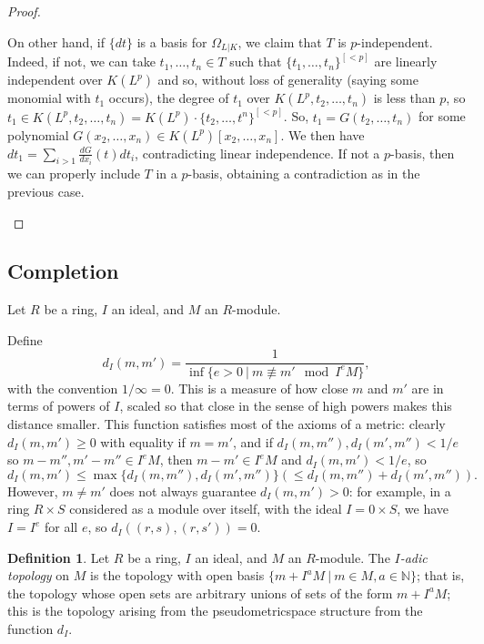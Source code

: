 \documentclass{amsart}[12pt]
\newcommand{\N}{\mathbb{N}}
\numberwithin{equation}{section}
\theoremstyle{plain} %
\theoremstyle{definition}
\newtheorem{defn}[equation]{Definition}
\theoremstyle{remark}
\begin{document}
\begin{proof}
\begin{enumerate}
On other hand, if $\{dt\}$ is a basis for  $\Omega_{L|K}$, we claim that $T$ is $p$-independent. Indeed, if not, we can take $t_1,\dots,t_n \in T$ such that $\{t_1,\dots,t_n\}^{[<p]}$ are linearly independent over $K(L^p)$ and so, without loss of generality (saying some monomial with $t_1$ occurs), the degree of $t_1$ over  $K(L^p,t_2,\dots,t_n)$ is less than $p$, so $t_1\in K(L^p,t_2,\dots,t_n)=K(L^p)\cdot \{t_2,\dots,t^n\}^{[<p]}$. So, $t_1=G(t_2,\dots,t_n)$ for some polynomial $G(x_2,\dots,x_n)\in K(L^p)[x_2,\dots,x_n]$. We then have $dt_1 = \sum_{i>1} \frac{d G}{d x_i}(t) dt_i$, contradicting linear independence. If not a $p$-basis, then we can properly include $T$ in a $p$-basis, obtaining a contradiction as in the previous case.\qedhere
\end{enumerate}
\end{proof}


\subsection{Completion}

Let $R$ be a ring, $I$ an ideal, and $M$ an $R$-module. 

Define \[d_I(m,m') = \frac{1}{\inf\{ e>0 \ | \ m\not\equiv m' \mod I^e M \}},\] with the convention $1/\infty = 0$. This is a measure of how close $m$ and $m'$ are in terms of powers of $I$, scaled so that close in the sense of high powers makes this distance smaller. This function satisfies most of the axioms of a metric: clearly $d_I(m,m')\geq 0$ with equality if $m=m'$, and if $d_I(m,m''), d_I(m',m'')< 1/e$ so $m-m'',m'-m''\in I^e M$, then $m-m'\in I^e M$ and $d_I(m,m')<1/e$, so
\[ d_I(m,m') \leq \max\{ d_I(m,m''), d_I(m',m'') \} ( \leq d_I(m,m'') + d_I(m',m'') ).\]
However, $m\neq m'$ does not always guarantee $d_I(m,m')>0$: for example, in a ring $R\times S$ considered as a module over itself, with the ideal $I=0\times S$, we have $I=I^e$ for all $e$, so $d_I((r,s),(r,s'))=0$.




\begin{defn} Let $R$ be a ring, $I$ an ideal, and $M$ an $R$-module. The \emph{$I$-adic topology} on $M$ is the topology with open basis $\{m + I^a M \ | \ m\in M, a\in \N\}$; that is, the topology whose open sets are arbitrary unions of sets of the form $m + I^a M$; this is the topology arising from the pseudometricspace structure from the function $d_I$.
\end{defn}
\end{document}
